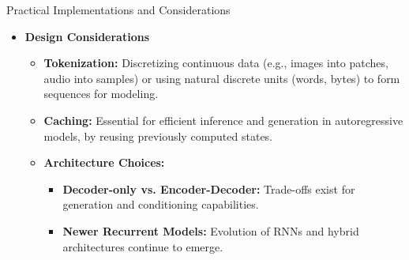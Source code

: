 \begin{frame}[allowframebreaks]{Practical Implementations and Considerations}
    \begin{itemize}
        \item \textbf{Design Considerations}
        \begin{itemize}
            \item \textbf{Tokenization:} Discretizing continuous data (e.g., images into patches, audio into samples) or using natural discrete units (words, bytes) to form sequences for modeling.
            \item \textbf{Caching:} Essential for efficient inference and generation in autoregressive models, by reusing previously computed states.
            \item \textbf{Architecture Choices:}
            \begin{itemize}
                \item \textbf{Decoder-only vs. Encoder-Decoder:} Trade-offs exist for generation and conditioning capabilities.
                \item \textbf{Newer Recurrent Models:} Evolution of RNNs and hybrid architectures continue to emerge.
            \end{itemize}
        \end{itemize}
    \end{itemize}
\end{frame}